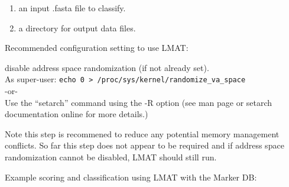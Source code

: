 \documentclass[11pt]{article}
\begin{document}
\begin{enumerate}[(1)]
\item 
{
 an input .fasta file to classify. 
 }
 \item
{ 
 a directory for output data files.
 }
\end{enumerate}


\noindent Recommended configuration setting to use LMAT: 

 disable address space randomization (if not already set).\\
   As super-user: \texttt{echo 0 > /proc/sys/kernel/randomize\_va\_space}\\
-or-\\
 Use the ``setarch'' command using the -R option (see man page or setarch documentation online for more details.)

Note this step is recommened to reduce any potential memory management conflicts. 
So far this step does not appear to be required and if address space randomization cannot be disabled, LMAT should 
still run.   

   
Example scoring and classification using LMAT with the Marker DB:
\end{document}
